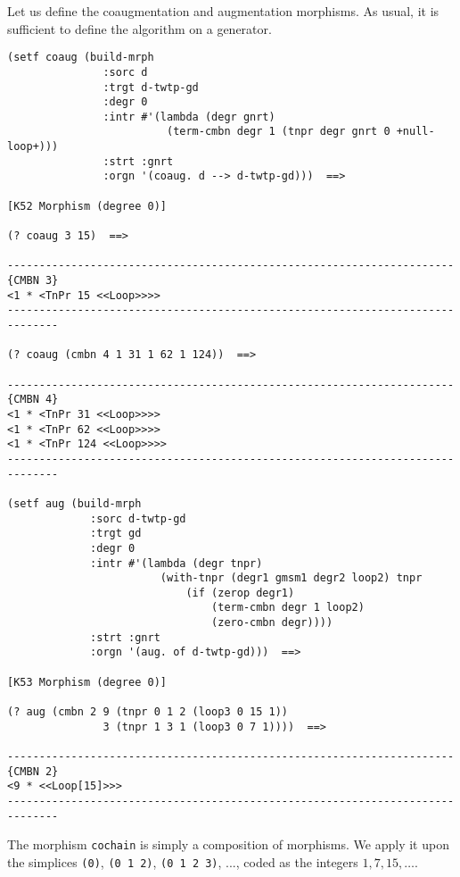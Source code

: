 Let us define the  coaugmentation and augmentation morphisms. As usual, it is sufficient
to define the algorithm on a generator. 
{\footnotesize\begin{verbatim}
(setf coaug (build-mrph 
               :sorc d 
               :trgt d-twtp-gd 
               :degr 0
               :intr #'(lambda (degr gnrt)
                         (term-cmbn degr 1 (tnpr degr gnrt 0 +null-loop+)))
               :strt :gnrt 
               :orgn '(coaug. d --> d-twtp-gd)))  ==>

[K52 Morphism (degree 0)]

(? coaug 3 15)  ==>

----------------------------------------------------------------------{CMBN 3}
<1 * <TnPr 15 <<Loop>>>>
------------------------------------------------------------------------------

(? coaug (cmbn 4 1 31 1 62 1 124))  ==>

----------------------------------------------------------------------{CMBN 4}
<1 * <TnPr 31 <<Loop>>>>
<1 * <TnPr 62 <<Loop>>>>
<1 * <TnPr 124 <<Loop>>>>
------------------------------------------------------------------------------

(setf aug (build-mrph
             :sorc d-twtp-gd
             :trgt gd
             :degr 0
             :intr #'(lambda (degr tnpr)
                        (with-tnpr (degr1 gmsm1 degr2 loop2) tnpr
                            (if (zerop degr1)
                                (term-cmbn degr 1 loop2)
                                (zero-cmbn degr))))
             :strt :gnrt
             :orgn '(aug. of d-twtp-gd)))  ==>

[K53 Morphism (degree 0)]

(? aug (cmbn 2 9 (tnpr 0 1 2 (loop3 0 15 1))
               3 (tnpr 1 3 1 (loop3 0 7 1))))  ==>

----------------------------------------------------------------------{CMBN 2}
<9 * <<Loop[15]>>>
------------------------------------------------------------------------------
\end{verbatim}}
The morphism {\tt cochain} is simply a composition of morphisms.
We apply it upon the simplices {\tt (0)},
{\tt (0 1 2)}, {\tt (0 1 2 3)}, ..., 
coded as the integers $1,7,15,\ldots$.
